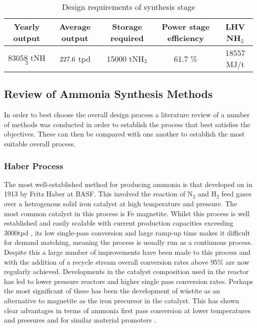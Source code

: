 \begin{table}[!htbp]

	\begin{center}
		\caption{Design requirements of synthesis stage \label{tab:req}}
			
		\begin{tabular}{|c|c|c|c|c|}
			\hline
			Yearly output& Average output & Storage required & Power stage efficiency&LHV NH$_3$     \\ \hline
			83058 tNH$_3$            & $227.6 $  tpd            & 15000 tNH$_3$                          & 61.7 \% &18557 MJ/t \\ \hline
		\end{tabular}
		
	\end{center}
\end{table}

\subsection{Review of Ammonia Synthesis Methods}

In order to best choose the overall design process a literature review of a number of methods was conducted in order to establish the process that best satisfies the objectives. These can then be compared with one another to establish the most suitable overall process. 

\subsubsection{Haber Process}
The most well-established method for producing ammonia is that developed on in 1913 by Fritz Haber at BASF. This involved the reaction of N$_2$ and H$_2$ feed gases over a hetrogenous solid iron catalyst at high temperature and pressure. The most common catalyst in this process is Fe magnetite. Whilst this process is well established and easily scalable with current production capacities exceeding 3000tpd \cite{Banares-alcantara2014}, its low single-pass conversion and large ramp-up time makes it difficult for demand matching, meaning the process is usually run as a continuous process. Despite this a large number of improvements have been made to this process and with the addition of a recycle stream overall conversion rates above 95\% are now regularly achieved. Developments in the catalyst composition used in the reactor has led to lower pressure reactors and higher single pass conversion rates. Perhaps the most significant of these has been the development of w\"{u}stite as an alternative to magnetite as the iron precursor in the catalyst. This has shown clear advantages in terms of ammonia first pass conversion at lower temperatures and pressures and for similar material promoters\cite{Pernicone2003} \cite{Liu1996}.



